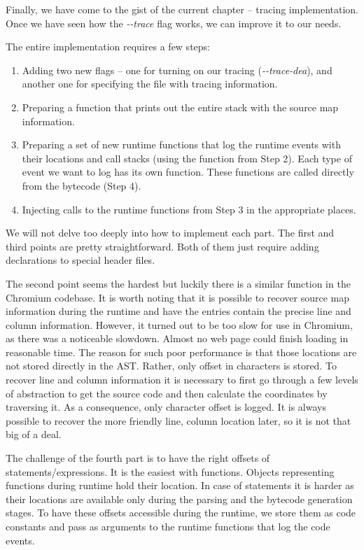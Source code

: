 Finally, we have come to the gist of the current chapter -- tracing implementation.
Once we have seen how the \emph{-{}-trace} flag works, we can improve it to our needs.

The entire implementation requires a few steps:
\begin{enumerate}
  \item Adding two new flags -- one for turning on our tracing (\emph{-{}-trace-dea}), and another one for specifying the file with tracing information.
  \item Preparing a function that prints out the entire stack with the source map information.
  \item Preparing a set of new runtime functions that log the runtime events with their locations and call stacks 
        (using the function from Step 2).
        Each type of event we want to log has its own function. These functions are called directly from the bytecode (Step 4).
  \item Injecting calls to the runtime functions from Step 3 in the appropriate places.
\end{enumerate}

We will not delve too deeply into how to implement each part.
The first and third points are pretty straightforward. Both of them just require adding declarations to special header files.

The second point seems the hardest but luckily there is a similar function in the Chromium codebase.
It is worth noting that it is possible to recover source map information during the runtime
and have the entries contain the precise line and column information. However, it turned out to be too slow
for use in Chromium, as there was a noticeable slowdown. Almost no web page could finish loading in reasonable time.
The reason for such poor performance is that those locations are not stored directly in the AST. Rather, only offset
in characters is stored. To recover line and column information it is necessary to first go through
a few levels of abstraction to get the source code and then calculate the coordinates by traversing it.
As a consequence, only character offset is logged. It is always possible to recover the more friendly
line, column location later, so it is not that big of a deal.

The challenge of the fourth part is to have the right offsets of statements/expressions.
It is the easiest with functions. Objects representing functions during runtime
hold their location. In case of statements it is harder 
as their locations are available only during the parsing and the bytecode generation stages.
To have these offsets accessible during the runtime, we store them as code constants
and pass as arguments to the runtime functions that log the code events.

